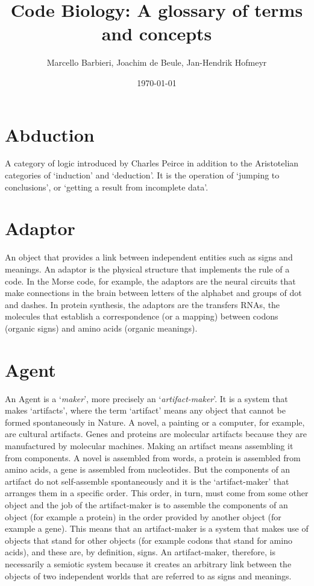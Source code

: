 \documentclass[12pt]{article}
\title{Code Biology: A glossary of terms and concepts}
\author{Marcello Barbieri, Joachim de Beule, Jan-Hendrik Hofmeyr}
\date{\today}
\begin{document}
\maketitle

\setcounter{secnumdepth}{0}
\tableofcontents

\newpage

\section{Abduction}
A category of logic introduced by Charles Peirce in addition to the Aristotelian categories of `induction' and `deduction'. It is the operation of `jumping to conclusions', or `getting a result from incomplete data'. 


\hypertarget{adaptor}{}
\section{Adaptor}
An object that provides a link between independent entities such as signs and meanings. An adaptor is the physical structure that implements the rule of a code. In the Morse code, for example, the adaptors are the neural circuits that make connections in the brain between letters of the alphabet and groups of dot and dashes. In protein synthesis, the adaptors are the transfers RNAs, the molecules that establish a correspondence (or a mapping) between codons (organic signs) and amino acids (organic meanings). 


\section{Agent}
An Agent is a `\textit{maker}', more precisely an `\textit{artifact-maker}'. It is a system that makes `artifacts', where the term `artifact' means any object that cannot be formed spontaneously in Nature. A novel, a painting or a computer, for example, are cultural artifacts. Genes and proteins are molecular artifacts because they are manufactured by molecular machines. Making an artifact means assembling it from components. A novel is assembled from words, a protein is assembled from amino acids, a gene is assembled from nucleotides. But the components of an artifact do not self-assemble spontaneously and it is the `artifact-maker' that arranges them in a specific order. This order, in turn, must come from some other object and the job of the artifact-maker is to assemble the components of an object (for example a protein) in the order provided by another object (for example a gene). This means that an artifact-maker is a system that makes use of objects that stand for other objects (for example codons that stand for amino acids), and these are, by definition, signs. An artifact-maker, therefore, is necessarily a semiotic system because it creates an arbitrary link between the objects of two independent worlds that are referred to as signs and meanings.
\end{document}

